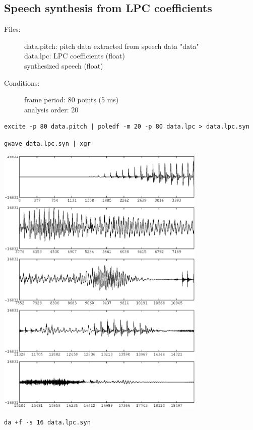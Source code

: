 \documentclass[a4paper,10pt]{article}
\begin{document}
\subsection{Speech synthesis from LPC coefficients}

\begin{description}
\item[Files:]
   data.pitch: pitch data extracted from speech data "data"\\
   data.lpc: LPC coefficients (float)\\
   synthesized speech (float)
\item[Conditions:]
  frame period: 80 points (5 ms)\\
  analysis order: 20
\end{description}

\begin{verbatim}
excite -p 80 data.pitch | poledf -m 20 -p 80 data.lpc > data.lpc.syn
\end{verbatim}

\begin{verbatim}
gwave data.lpc.syn | xgr
\end{verbatim}

\includegraphics[width=10cm]{data.lpc.syn.gwave.eps}

\begin{verbatim}
da +f -s 16 data.lpc.syn
\end{verbatim}
\end{document}
